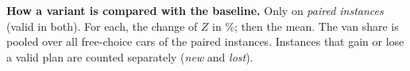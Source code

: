 \textbf{How a variant is compared with the baseline.} Only on \emph{paired instances} (valid in both). For each, the change of $Z$ in \%; then the mean. The van share is pooled over all free-choice cars of the paired instances. Instances that gain or lose a valid plan are counted separately (\emph{new} and \emph{lost}).

